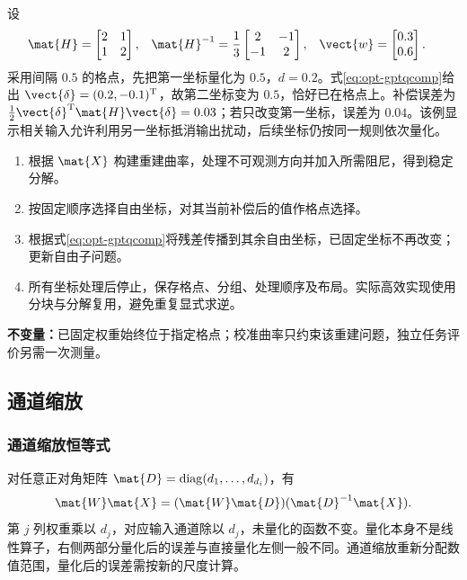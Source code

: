 \documentclass[../textbook.tex]{subfiles}
\begin{document}
\begin{example}
\optional


设
\begin{align*}
 \mat{H} &= \begin{bmatrix}2&1\\1&2\end{bmatrix}, &
 \mat{H}^{-1} &= \frac13\begin{bmatrix}2&-1\\-1&2\end{bmatrix}, &
 \vect{w} &= \begin{bmatrix}0.3\\0.6\end{bmatrix}.
\end{align*}
采用间隔 $0.5$ 的格点，先把第一坐标量化为 $0.5$，$d=0.2$。式\eqref{eq:opt-gptqcomp}给出 $\vect{\delta}=(0.2,-0.1)^{\mathrm{T}}$，故第二坐标变为 $0.5$，恰好已在格点上。补偿误差为 $\tfrac12\vect{\delta}^{\mathrm{T}}\mat{H}\vect{\delta}=0.03$；若只改变第一坐标，误差为 $0.04$。该例显示相关输入允许利用另一坐标抵消输出扰动，后续坐标仍按同一规则依次量化。
\end{example}

\begin{algorithm}[二阶补偿量化的概念流程]
\begin{enumerate}
\item 根据 $\mat{X}$ 构建重建曲率，处理不可观测方向并加入所需阻尼，得到稳定分解。
\item 按固定顺序选择自由坐标，对其当前补偿后的值作格点选择。
\item 根据式\eqref{eq:opt-gptqcomp}将残差传播到其余自由坐标，已固定坐标不再改变；更新自由子问题。
\item 所有坐标处理后停止，保存格点、分组、处理顺序及布局。实际高效实现使用分块与分解复用，避免重复显式求逆。
\end{enumerate}
\textbf{不变量：}已固定权重始终位于指定格点；校准曲率只约束该重建问题，独立任务评价另需一次测量。
\end{algorithm}

\subsection{通道缩放}

\subsubsection{通道缩放恒等式}
对任意正对角矩阵 $\mat{D}=\operatorname{diag}(d_1,\ldots,d_{d_i})$，有
\begin{equation}
\mat{W}\mat{X}=(\mat{W}\mat{D})(\mat{D}^{-1}\mat{X}).
\label{eq:opt-scaling}
\end{equation}
第 $j$ 列权重乘以 $d_j$，对应输入通道除以 $d_j$，未量化的函数不变。量化本身不是线性算子，右侧两部分量化后的误差与直接量化左侧一般不同。通道缩放重新分配数值范围，量化后的误差需按新的尺度计算。
\end{document}
